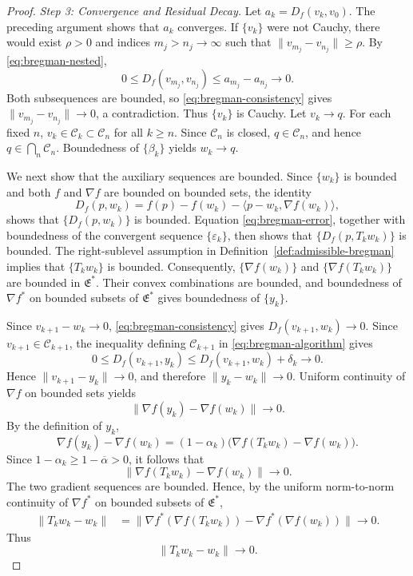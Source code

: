 \documentclass[leqno,12pt]{amsart}
\theoremstyle{definition}
\theoremstyle{remark}
\numberwithin{equation}{section}
\newcommand{\E}{\mathfrak{E}}
\newcommand{\C}{\mathscr{C}}
\begin{document}
\begin{proof}
\smallskip
\noindent\emph{Step 3: Convergence and Residual Decay.}
Let $a_k=D_f(v_k,v_0)$. The preceding argument shows that $a_k$ converges. If $\{v_k\}$ were not Cauchy, there would exist $\rho>0$ and indices $m_j>n_j\to\infty$ such that $\|v_{m_j}-v_{n_j}\|\geq\rho$. By \eqref{eq:bregman-nested},
\[
 0\leq D_f(v_{m_j},v_{n_j})\leq a_{m_j}-a_{n_j}\longrightarrow0.
\]
Both subsequences are bounded, so \eqref{eq:bregman-consistency} gives $\|v_{m_j}-v_{n_j}\|\to0$, a contradiction. Thus $\{v_k\}$ is Cauchy. Let $v_k\to q$. For each fixed $n$, $v_k\in\C_k\subset\C_n$ for all $k\geq n$. Since $\C_n$ is closed, $q\in\C_n$, and hence $q\in\bigcap_n\C_n$. Boundedness of $\{\beta_k\}$ yields $w_k\to q$.

We next show that the auxiliary sequences are bounded. Since $\{w_k\}$ is bounded and both $f$ and $\nabla f$ are bounded on bounded sets, the identity
\[
 D_f(p,w_k)=f(p)-f(w_k)-\langle p-w_k,\nabla f(w_k)\rangle,
\]
shows that $\{D_f(p,w_k)\}$ is bounded. Equation \eqref{eq:bregman-error}, together with boundedness of the convergent sequence $\{\varepsilon_k\}$, then shows that $\{D_f(p,T_kw_k)\}$ is bounded. The right-sublevel assumption in Definition~\ref{def:admissible-bregman} implies that $\{T_kw_k\}$ is bounded. Consequently, $\{\nabla f(w_k)\}$ and $\{\nabla f(T_kw_k)\}$ are bounded in $\E^*$. Their convex combinations are bounded, and boundedness of $\nabla f^*$ on bounded subsets of $\E^*$ gives boundedness of $\{y_k\}$.

Since $v_{k+1}-w_k\to0$, \eqref{eq:bregman-consistency} gives $D_f(v_{k+1},w_k)\to0$. Since $v_{k+1}\in\C_{k+1}$, the inequality defining $\C_{k+1}$ in \eqref{eq:bregman-algorithm} gives
\[
 0\leq D_f(v_{k+1},y_k)
 \leq D_f(v_{k+1},w_k)+\delta_k\to0.
\]
Hence $\|v_{k+1}-y_k\|\to0$, and therefore $\|y_k-w_k\|\to0$. Uniform continuity of $\nabla f$ on bounded sets yields
\[
 \|\nabla f(y_k)-\nabla f(w_k)\|\to0.
\]
By the definition of $y_k$,
\[
 \nabla f(y_k)-\nabla f(w_k)
 =(1-\alpha_k)\bigl(\nabla f(T_kw_k)-\nabla f(w_k)\bigr).
\]
Since $1-\alpha_k\geq1-\overline\alpha>0$, it follows that
\[
 \|\nabla f(T_kw_k)-\nabla f(w_k)\|\to0.
\]
The two gradient sequences are bounded. Hence, by the uniform norm-to-norm continuity of $\nabla f^*$ on bounded subsets of $\E^*$,
\begin{align*}
 \|T_kw_k-w_k\|
 &=\bigl\|\nabla f^*(\nabla f(T_kw_k))
 -\nabla f^*(\nabla f(w_k))\bigr\|\longrightarrow0.
\end{align*}
Thus
\begin{equation}\label{eq:bregman-residual}
 \|T_kw_k-w_k\|\to0.
\end{equation}


\end{proof}
\end{document}
